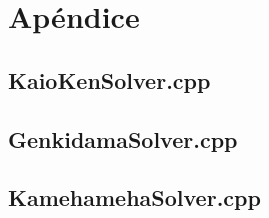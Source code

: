 \section{Apéndice}\label{sec:codigo}

\subsection{KaioKenSolver.cpp}

\subsection{GenkidamaSolver.cpp}

\subsection{KamehamehaSolver.cpp}

